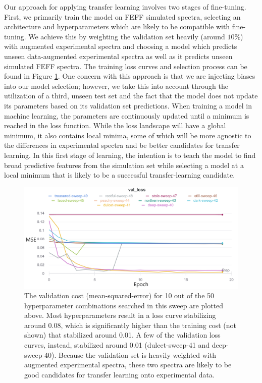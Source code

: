 \egroup


Our approach for applying transfer learning involves two stages of fine-tuning. First, we primarily train the model on FEFF simulated spectra, selecting an architecture and hyperparameters which are likely to be compatible with fine-tuning. We achieve this by weighting the validation set heavily (around $ 10\% $) with augmented experimental spectra and choosing a model which predicts unseen data-augmented experimental spectra as well as it predicts unseen simulated FEFF spectra. The training loss curves and selection process can be found in Figure \ref{fig:meta-1-sweep-loss}. One concern with this approach is that we are injecting biases into our model selection; however, we take this into account through the utilization of a third, unseen test set and the fact that the model does not update its parameters based on its validation set predictions. When training a model in machine learning, the parameters are continuously updated until a minimum is reached in the loss function. While the loss landscape will have a global minimum, it also contains local minima, some of which will be more agnostic to the differences in experimental spectra and be better candidates for transfer learning. In this first stage of learning, the intention is to teach the model to find broad predictive features from the simulation set while selecting a model at a local minimum that is likely to be a successful transfer-learning candidate. 


\begin{figure}
    \centering
    \includegraphics[width=\linewidth]{Chapters/Figures/10-sweep.png}
    \caption[Hyperparamater Sweep: Cost Curve]{The validation cost (mean-squared-error) for 10 out of the 50 hyperparameter combinations searched in this sweep are plotted above. Most hyperparameters result in a loss curve stabilizing around 0.08, which is significantly higher than the training cost (not shown) that stabilized around 0.01. A few of the validation loss curves, instead, stabilized around 0.01 (dulcet-sweep-41 and deep-sweep-40). Because the validation set is heavily weighted with augmented experimental spectra, these two spectra are likely to be good candidates for transfer learning onto experimental data.}
    \label{fig:meta-1-sweep-loss}
\end{figure}

